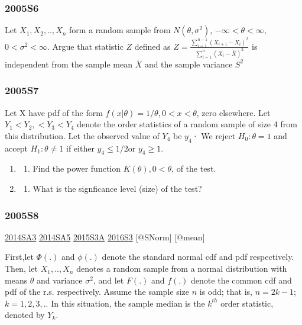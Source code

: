 \documentclass[6pt,twocolumn,Portrait]{article}
\providecommand{\tightlist}{%
  \setlength{\itemsep}{0pt}\setlength{\parskip}{0pt}}
\begin{document}
\hypertarget{s6-1}{%
\subsubsection{2005S6}\label{s6-1}}

Let \(X_1,X_2,..,X_n\) form a random sample from \(N(\theta,\sigma^2)\),
\(-\infty<\theta<\infty\),\(0<\sigma^2<\infty\). Argue that statistic
\(Z\) defined as
\(Z=\frac{\sum_{i=1}^{n-1}(X_{i+1}-X_{i})^2}{\sum_{i=1}^{n}(X_{i}-\bar X)^2}\)
is independent from the sample mean \(\bar X\) and the sample variance
\(S^2\)

\hypertarget{s7-1}{%
\subsubsection{2005S7}\label{s7-1}}

Let X have pdf of the form \(f(x|\theta)=1/\theta, 0<x<\theta\), zero
elsewhere. Let \(Y_1<Y_2,<Y_3<Y_4\) denote the order statistics of a
random sample of size 4 from this distribution. Let the observed value
of \(Y_4\) be \(y_4\)· We reject \(H_0:\theta=1\) and accept
\(H_1:\theta\neq1\) if either \(y_4\le1/2\)or \(y_4\ge1\).

\begin{enumerate}
\def\labelenumi{(\alph{enumi})}
\item
  \begin{enumerate}
  \def\labelenumii{(\arabic{enumii})}
  \setcounter{enumii}{5}
  \tightlist
  \item
    Find the power function \(K(\theta), 0<\theta\), of the test.
  \end{enumerate}
\item
  \begin{enumerate}
  \def\labelenumii{(\arabic{enumii})}
  \setcounter{enumii}{3}
  \tightlist
  \item
    What is the signficance level (size) of the test?
  \end{enumerate}
\end{enumerate}

\hypertarget{s8-1}{%
\subsubsection{2005S8}\label{s8-1}}

\protect\hyperlink{sa3-2}{2014SA3} \protect\hyperlink{sa5-1}{2014SA5}
\protect\hyperlink{s3a-1}{2015S3A} \protect\hyperlink{s3-4}{2016S3}
{[}@SNorm{]} {[}@mean{]}

First,let \(\Phi(.)\) and \(\phi(.)\) denote the standard normal cdf and
pdf respectively. Then, let \(X_1,..,X_n\) denotes a random sample from
a normal distribution with means \(\theta\) and variance \(\sigma^2\),
and let \(F(.)\) and \(f(.)\) denote the common cdf and pdf of the r.s.
respectively. Assume the sample size \(n\) is odd; that is, \(n=2k-1\);
\(k=1,2,3,..\) In this situation, the sample median is the \(k^{th}\)
order statistic, denoted by \(Y_k\).
\end{document}

